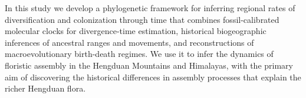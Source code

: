 In this study we develop a phylogenetic framework for inferring regional rates of diversification and colonization through time that combines fossil-calibrated molecular clocks for divergence-time estimation, historical biogeographic inferences of ancestral ranges and movements, and reconstructions of macroevolutionary birth-death regimes. We use it to infer the dynamics of floristic assembly in the Hengduan Mountains and Himalayas, with the primary aim of discovering the historical differences in assembly processes that explain the richer Hengduan flora.


